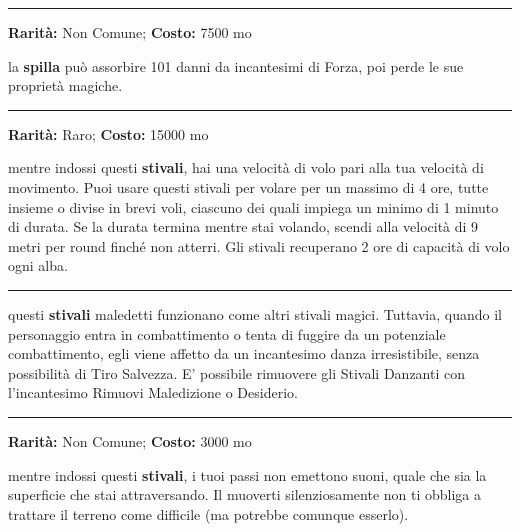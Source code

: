 \begin{multicols}{2}
\smallskip\noindent\rule{\linewidth}{2pt}  \hypertarget{SpilladellaDifesa}{}\medskip{}\noindent\label{SpilladellaDifesa}

\textbf{Rarità:} Non Comune; \textbf{Costo:} 7500 mo

la \textbf{spilla} può assorbire 101 danni da incantesimi di Forza, poi perde le sue proprietà magiche.

\smallskip\noindent\rule{\linewidth}{2pt}  \hypertarget{StivaliAlati}{}\medskip{}\noindent\label{StivaliAlati}

\textbf{Rarità:} Raro; \textbf{Costo:} 15000 mo

mentre indossi questi \textbf{stivali}, hai una velocità di volo pari alla tua velocità di movimento. Puoi usare questi stivali per volare per un massimo di 4 ore, tutte insieme o divise in brevi voli, ciascuno dei quali impiega un minimo di 1 minuto di durata. Se la durata termina mentre stai volando, scendi alla velocità di 9 metri per round finché non atterri. Gli stivali recuperano 2 ore di capacità di volo ogni alba.

\smallskip\noindent\rule{\linewidth}{2pt}  \hypertarget{StivaliDanzanti}{}\medskip{}\noindent\label{StivaliDanzanti}

questi \textbf{stivali} maledetti funzionano come altri stivali magici. Tuttavia, quando il personaggio entra in combattimento o tenta di fuggire da un potenziale combattimento, egli viene affetto da un incantesimo danza irresistibile, senza possibilità di Tiro Salvezza. E' possibile rimuovere gli Stivali Danzanti con l'incantesimo Rimuovi Maledizione o Desiderio.

\smallskip\noindent\rule{\linewidth}{2pt}  \hypertarget{StivalidegliElfi}{}\medskip{}\noindent\label{StivalidegliElfi}

\textbf{Rarità:} Non Comune; \textbf{Costo:} 3000 mo

mentre indossi questi \textbf{stivali}, i tuoi passi non emettono suoni, quale che sia la superficie che stai attraversando. Il muoverti silenziosamente non ti obbliga a trattare il terreno come difficile (ma potrebbe comunque esserlo).


\end{multicols}
